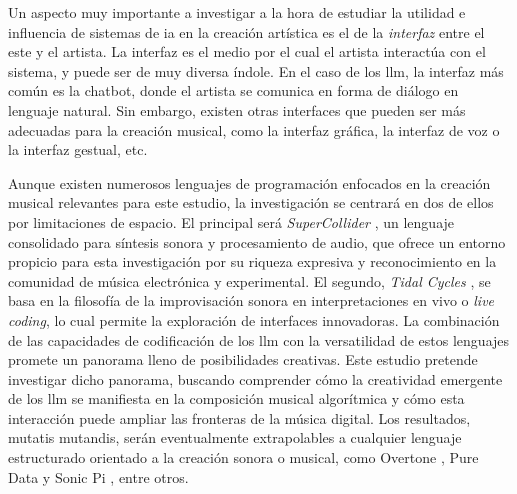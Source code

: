   
  
  
  
  


Un aspecto muy importante a investigar a la hora de estudiar la utilidad e influencia de sistemas de \gls{ia} en la creación artística es el de la \emph{interfaz} entre el este y el artista. La interfaz es el medio por el cual el artista interactúa con el sistema, y puede ser de muy diversa índole. En el caso de los \gls{llm}, la interfaz más común es la {chatbot}, donde el artista se comunica en forma de diálogo en lenguaje natural. Sin embargo, existen otras interfaces que pueden ser más adecuadas para la creación musical, como la interfaz gráfica, la interfaz de voz o la interfaz gestual, etc.

Aunque existen numerosos lenguajes de programación enfocados en la creación musical relevantes para este estudio, la investigación se centrará en dos de ellos por limitaciones de espacio. El principal será \emph{SuperCollider} \cite{SupercolliderSupercollider2024}, un lenguaje consolidado para síntesis sonora y procesamiento de audio, que ofrece un entorno propicio para esta investigación por su riqueza expresiva y reconocimiento en la comunidad de música electrónica y experimental. El segundo, \emph{Tidal Cycles} \citep{LiveCodeTidal}, se basa en la filosofía de la improvisación sonora en interpretaciones en vivo o \emph{live coding}, lo cual permite la exploración de interfaces innovadoras. La combinación de las capacidades de codificación de los \gls{llm} con la versatilidad de estos lenguajes promete un panorama lleno de posibilidades creativas. Este estudio pretende investigar dicho panorama, buscando comprender cómo la creatividad emergente de los \gls{llm} se manifiesta en la composición musical algorítmica y cómo esta interacción puede ampliar las fronteras de la música digital. Los resultados, mutatis mutandis, serán eventualmente extrapolables a cualquier lenguaje estructurado orientado a la creación sonora o musical, como {Overtone} \citep{OvertoneCollaborativeProgrammable}, {Pure Data} \citep{PureDataPd} y {Sonic Pi} \citep{SonicPiLive}, entre otros.

